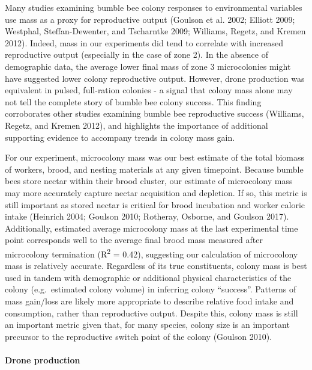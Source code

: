 \documentclass[11pt,]{article}
\let\oldparagraph\paragraph
\renewcommand{\paragraph}[1]{\oldparagraph{#1}\mbox{}}
\begin{document}
Many studies examining bumble bee colony responses to environmental
variables use mass as a proxy for reproductive output (Goulson et al.
2002; Elliott 2009; Westphal, Steffan-Dewenter, and Tscharntke 2009;
Williams, Regetz, and Kremen 2012). Indeed, mass in our experiments did
tend to correlate with increased reproductive output (especially in the
case of zone 2). In the absence of demographic data, the average lower
final mass of zone 3 microcolonies might have suggested lower colony
reproductive output. However, drone production was equivalent in pulsed,
full-ration colonies - a signal that colony mass alone may not tell the
complete story of bumble bee colony success. This finding corroborates
other studies examining bumble bee reproductive success (Williams,
Regetz, and Kremen 2012), and highlights the importance of additional
supporting evidence to accompany trends in colony mass gain.

For our experiment, microcolony mass was our best estimate of the total
biomass of workers, brood, and nesting materials at any given timepoint.
Because bumble bees store nectar within their brood cluster, our
estimate of microcolony mass may more accurately capture nectar
acquisition and depletion. If so, this metric is still important as
stored nectar is critical for brood incubation and worker caloric intake
(Heinrich 2004; Goulson 2010; Rotheray, Osborne, and Goulson 2017).
Additionally, estimated average microcolony mass at the last
experimental time point corresponds well to the average final brood mass
measured after microcolony termination (R\textsuperscript{2} = 0.42),
suggesting our calculation of microcolony mass is relatively accurate.
Regardless of its true constituents, colony mass is best used in tandem
with demographic or additional physical characteristics of the colony
(e.g.~estimated colony volume) in inferring colony ``success''. Patterns
of mass gain/loss are likely more appropriate to describe relative food
intake and consumption, rather than reproductive output. Despite this,
colony mass is still an important metric given that, for many species,
colony size is an important precursor to the reproductive switch point
of the colony (Goulson 2010).

\hypertarget{drone-production}{%
\paragraph{Drone production}\label{drone-production}}
\end{document}
